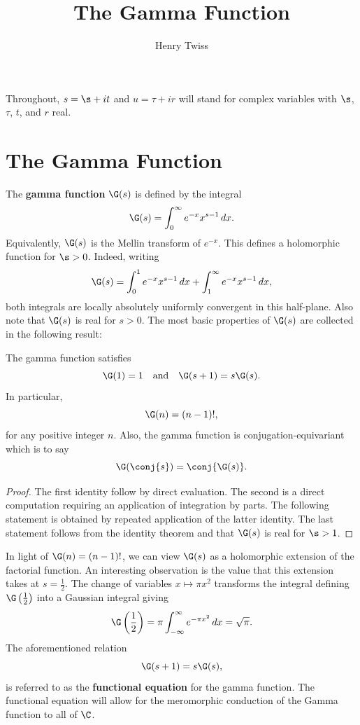\documentclass[12pt]{article}
\title{The Gamma Function}
\author{Henry Twiss}
\begin{document}
  \date{}
  \maketitle
  Throughout, \(s = \s+it\) and \(u = \tau+ir\) will stand for complex variables with \(\s\), \(\tau\), \(t\), and \(r\) real. 
  \section{The Gamma Function}
    The \textbf{gamma function} \(\G(s)\) is defined by the integral
    \[
      \G(s) = \int_{0}^{\infty}e^{-x}x^{s-1}\,dx.
    \]
    Equivalently, \(\G(s)\) is the Mellin transform of \(e^{-x}\). This defines a holomorphic function for \(\s > 0\). Indeed, writing
    \[
      \G(s) = \int_{0}^{1}e^{-x}x^{s-1}\,dx+\int_{1}^{\infty}e^{-x}x^{s-1}\,dx,
    \]
    both integrals are locally absolutely uniformly convergent in this half-plane. Also note that \(\G(s)\) is real for \(s > 0\). The most basic properties of \(\G(s)\) are collected in the following result:

    \begin{proposition}\label{prop:Factorial_properties_of_gamma_function}
      The gamma function satisfies
      \[
        \G(1) = 1 \quad \text{and} \quad \G(s+1) = s\G(s).
      \]
      In particular,
      \[
        \G(n) = (n-1)!,
      \]
      for any positive integer \(n\). Also, the gamma function is conjugation-equivariant which is to say
      \[
        \G(\conj{s}) = \conj{\G(s)}.
      \]
    \end{proposition}
    \begin{proof}
      The first identity follow by direct evaluation. The second is a direct computation requiring an application of integration by parts. The following statement is obtained by repeated application of the latter identity. The last statement follows from the identity theorem and that \(\G(s)\) is real for \(\s > 1\).
    \end{proof}

    In light of \(\G(n) = (n-1)!\), we can view \(\G(s)\) as a holomorphic extension of the factorial function. An interesting observation is the value that this extension takes at \(s = \frac{1}{2}\). The change of variables \(x \mapsto \pi x^{2}\) transforms the integral defining \(\G\left(\frac{1}{2}\right)\) into a Gaussian integral giving
    \begin{equation}\label{equ:gamma_function_at_1/2}
      \G\left(\frac{1}{2}\right) = \pi\int_{-\infty}^{\infty}e^{-\pi x^{2}}\,dx = \sqrt{\pi}.
    \end{equation}
    The aforementioned relation
    \[
      \G(s+1) = s\G(s),
    \]
    is referred to as the \textbf{functional equation} for the gamma function. The functional equation will allow for the meromorphic conduction of the Gamma function to all of \(\C\).
\end{document}
